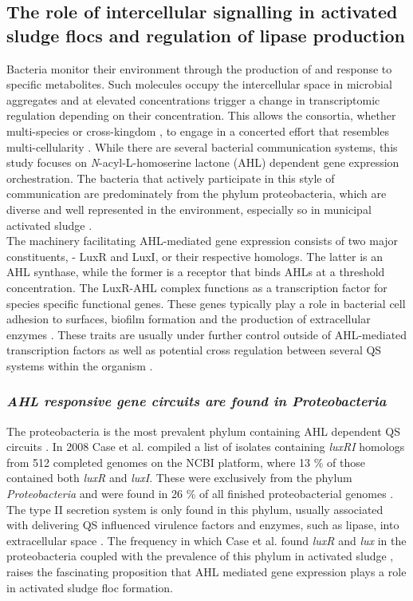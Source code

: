 \documentclass[twoside]{article}
\begin{document}
\subsection{The role of intercellular signalling in activated sludge flocs and regulation of lipase production}
Bacteria monitor their environment through the production of and response to specific metabolites. Such molecules occupy the intercellular space in microbial aggregates and at elevated concentrations trigger a change in transcriptomic regulation depending on their concentration. This allows the consortia, whether multi-species or cross-kingdom \citep{williams2007quorum}, to engage in a concerted effort that resembles multi-cellularity \cite{kjelleberg2002}. While there are several bacterial communication systems, this study focuses on \emph{N}-acyl-L-homoserine lactone (AHL) dependent gene expression orchestration. The bacteria that actively participate in this style of communication are predominately from the phylum proteobacteria, which are diverse and well represented in the environment, especially so in municipal activated sludge \cite{Hesham_11,Wagner_02}.  \\


The machinery facilitating AHL-mediated gene expression consists of two major constituents, - LuxR and LuxI, or their respective homologs. The latter is an AHL synthase, while the former is a receptor that binds AHLs at a threshold concentration. The LuxR-AHL complex functions as a transcription factor for species specific functional genes. These genes typically play a role in bacterial cell adhesion to surfaces, biofilm formation and the production of extracellular enzymes \cite{Flemming_10}.
These traits are usually under further control outside of AHL-mediated transcription factors as well as potential cross regulation between several QS systems within the organism \cite{juhas2005}.


\subsubsection{\emph{AHL responsive gene circuits are found in Proteobacteria}}
The proteobacteria is the most prevalent phylum containing AHL dependent QS circuits \cite{gelencser_12}. In 2008 Case et al. compiled a list of isolates containing \emph{luxRI} homologs from 512 completed genomes on the NCBI platform, where 13 \% of those contained both \emph{luxR} and \emph{luxI}. These were exclusively from the phylum \emph{Proteobacteria} and were found in 26 \% of all finished proteobacterial genomes \cite{case_08}.
The type II secretion system is only found in this phylum, usually associated with delivering QS influenced virulence factors and enzymes, such as lipase, into extracellular space \cite{sandkvist2001}. 
The frequency in which Case et al. found \emph{luxR} and \emph{lux} in the proteobacteria \cite{case_08} coupled with the prevalence of this phylum in activated sludge \cite{Wagner_02,Hesham_11}, raises the fascinating proposition that AHL mediated gene expression plays a role in activated sludge floc formation.
\end{document}
